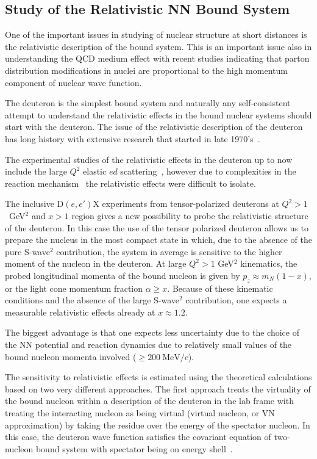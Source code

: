 \subsection{Study of the Relativistic NN Bound System}

One of the important issues in studying of nuclear structure  at short distances is the 
relativistic description of the bound system.  This is an important issue also in 
understanding the QCD medium effect with recent studies indicating that  parton distribution 
modifications  in nuclei are proportional to the high momentum component of nuclear wave function.

The deuteron is the simplest bound system and naturally any self-consistent attempt  to understand the 
relativistic effects in the bound nuclear systems  should start with the deuteron. 
The issue of the relativistic description of the deuteron has long history with extensive research that started in late 1970's~\cite{Gross:1982nz,Buck:1979ff,Frankfurt:1977vc,Frankfurt:1981mk}.

The experimental studies of the relativistic effects in the deuteron  up to now include the large $Q^2$ elastic 
$ed$ scattering~\cite{Alexa:1998fe}, however  
due to complexities  in the reaction mechanism~\cite{VanOrden:1995eg} the relativistic effects were 
difficult to isolate.

The inclusive D$(e,e')$X experiments from tensor-polarized deuterons at  $Q^2>1$~GeV$^2$ and $x>1$ region gives 
a new possibility to probe the relativistic structure of the deuteron.  In this case the use of the tensor polarized
deuteron allows us to prepare the nucleus in the most compact state in which, due to the absence of the 
pure S-wave$^2$ contribution, the system in average is sensitive to the higher moment of the nucleon in the deuteron.
At large $Q^2>1$ GeV$^2$ kinematics, the probed longitudinal momenta of the bound nucleon is given by $p_z \approx m_N(1-x)$, 
or the light cone momentum fraction $\alpha \ge x$. Because of these kinematic conditions and the absence of the 
large S-wave$^2$ contribution, one expects a measurable relativistic effects already at $x\approx 1.2$.  

The biggest advantage is that one expects less uncertainty due to the choice of the NN potential  and reaction dynamics due to relatively small values of the bound nucleon momenta involved ($\ge 200~\mathrm{MeV}/c$).

The sensitivity to relativistic effects is estimated using the theoretical calculations based on two 
very different approaches.   The first approach treats the  virtuality of the bound nucleon within a
description of the deuteron in the lab frame  with treating the interacting nucleon as being 
virtual (virtual nucleon, or VN approximation) 
by taking the residue over the energy of the spectator nucleon.
In this case, the deuteron wave function satisfies the covariant equation of two-nucleon bound system 
with spectator being on energy shell~\cite{Sargsian:2009hf,Gross:2010qm}.

